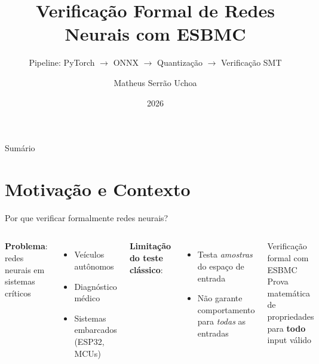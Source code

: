 \documentclass[aspectratio=169]{beamer}
\title[Verificação Formal de Redes Neurais]{%
  Verificação Formal de Redes Neurais com ESBMC}
\subtitle{Pipeline: PyTorch $\to$ ONNX $\to$ Quantização $\to$ Verificação SMT}
\author{Matheus Serrão Uchoa}
\institute{Laboratório de Verificação Formal --- PIBIC}
\date{2026}
\begin{document}

\begin{frame}
  \titlepage
\end{frame}

\begin{frame}{Sumário}
  \tableofcontents
\end{frame}

\section{Motivação e Contexto}

\begin{frame}[fragile]{Por que verificar formalmente redes neurais?}
  \begin{columns}
    \textbf{Problema}: redes neurais em sistemas críticos
    \begin{itemize}
      \item Veículos autônomos
      \item Diagnóstico médico
      \item Sistemas embarcados (ESP32, MCUs)
    \end{itemize}
    \vspace{0.4em}
    \textbf{Limitação do teste clássico}:
    \begin{itemize}
      \item Testa \emph{amostras} do espaço de entrada
      \item Não garante comportamento para \emph{todas} as entradas
    \end{itemize}
    \vspace{0.4em}
    \begin{alertblock}{Verificação formal com ESBMC}
      \centering Prova matemática de propriedades\\para \textbf{todo} input válido
    \end{alertblock}

  \end{columns}
\end{frame}
\end{document}
